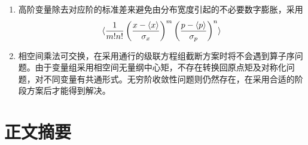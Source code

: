 \begin{enumerate}
	\item 高阶变量除去对应阶的标准差来避免由分布宽度引起的不必要数字膨胀，采用
	\begin{equation}
		\langle \frac{1}{m!n!}\left(\frac{x-\langle x \rangle}{\sigma_x}\right)^m\left(\frac{p-\langle p \rangle}{\sigma_p}\right)^n \rangle
		\end{equation}

	\item 相空间乘法可交换，在采用通行的级联方程组截断方案时将不会遇到算子序问题。由于变量组采用相空间无量纲中心矩，不存在转换回原点矩及对称化问题，对不同变量有共通形式。无穷阶收敛性问题则仍然存在，在采用合适的阶段方案后才能得到解决。	
\end{enumerate}

\section{正文摘要}
